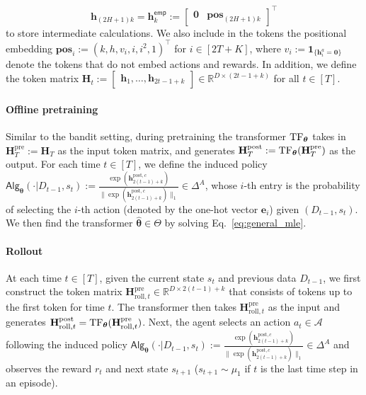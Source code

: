 \documentclass[10pt]{article}
\newcommand{\<}{\left\langle}
\renewcommand{\>}{\right\rangle}
\newcommand{\TF}{{\rm TF}}
\newcommand{\bzero}{{\mathbf 0}}
\newcommand{\bone}{{\mathbf 1}}
\newcommand{\R}{\mathbb{R}}
\newcommand{\pre}{{\mathrm{pre}}}
\newcommand{\posv}{{\mathbf{pos}}}
\newcommand{\post}{{\mathrm{post}}}
\newcommand{\parta}{{a}}
\newcommand{\partc}{{c}}
\newcommand{\state}{{s}}
\newcommand{\action}{{a}}
\newcommand{\reward}{{r}}
\newcommand{\totlen}{{T}} %
\newcommand{\sAlg}{{\mathsf{Alg}}}
\newcommand{\dset}{{D}}
\newcommand{\esttfpar}{{\widehat{\btheta}}}
\newcommand{\Numepi}{{K}}
\newcommand{\horizon}{{H}}
\newcommand{\actionsp}{{\mathcal{A}}}
\renewcommand{\horizon}{{H}}
\newcommand{\init}{{\mu_1}}
\newcommand{\tfpar}{{\btheta}}
\newcommand{\tfparspace}{{\Theta}}
\newcommand{\roll}{{\mathrm{roll}}}
\newcommand{\Numact}{{A}}
\newcommand{\oddeven}{{v}}
\newcommand{\emp}{{\mathsf{emp}}}
\def\bH{{\mathbf H}}
\def\btheta{{\boldsymbol \theta}}
\def\be{{\mathbf e}}
\def\bh{{\mathbf h}}
\begin{document}
$$
\bh_{(2\horizon+1)k}=\bh^{\emp}_{k}:=\begin{bmatrix}
    \bzero &\posv_{(2\horizon+1)k}
\end{bmatrix}^\top
$$ to store intermediate calculations. We also include in the tokens  the positional embedding $\posv_i:=(k,h,v_i,i,i^2,1)^\top$ for $i\in[2\totlen+\Numepi]$, where $\oddeven_i:=\bone_{\{\bh_i^\parta=\bzero\}}$  denote the tokens that do not embed actions and rewards.    In addition, we define  the token matrix $\bH_t:=\begin{bmatrix}
    \bh_1,\ldots,\bh_{2t-1+k}
\end{bmatrix}\in\R^{D\times (2t-1+k)}$ for all $t\in[\totlen]$.




\paragraph{Offline pretraining} 
Similar to the bandit setting, during
pretraining the transformer $\TF_\tfpar$ takes in   $\bH_\totlen^\pre:=\bH_\totlen$ as the input token matrix, and generates $\bH_\totlen^\post:=\TF_\tfpar(\bH_\totlen^\pre)$ as the output. For each time $t\in[\totlen]$, we define the  induced policy  $\sAlg_\tfpar(\cdot|\dset_{t-1},\state_t):=\frac{\exp(\bh^{\post,\partc}_{2(t-1)+k})}{\|\exp(\bh^{\post,\partc}_{2(t-1)+k})\|_1}\in\Delta^\Numact$, whose $i$-th entry is the probability of selecting the $i$-th action (denoted by the  one-hot vector $\be_i$) given $(\dset_{t-1},\state_t)$. We then find the transformer $\esttfpar\in\tfparspace$ by solving Eq.~\eqref{eq:general_mle}. 

\paragraph{Rollout}
At each time $t\in[\totlen]$, given the  current state $\state_t$ and  previous data $\dset_{t-1}$, we first construct the token matrix $\bH^{\pre}_{\roll,t}\in\R^{D\times 2(t-1)+k}$ that consists of tokens up to the first token for time $t$.   The transformer then takes $\bH^{\pre}_{\roll,t}$ as the input  and generates $\bH^{\post}_{\roll,t}=\TF_\tfpar(\bH^{\pre}_{\roll,t})$. Next,  the agent selects an action $\action_t\in\actionsp$ following  the induced  policy $\sAlg_\tfpar(\cdot|\dset_{t-1},\state_t):=\frac{\exp(\bh^{\post,\partc}_{2(t-1)+k})}{\|\exp(\bh^{\post,\partc}_{2(t-1)+k})\|_1}\in\Delta^\Numact$ and observes the reward $\reward_t$ and next state $\state_{t+1}$ ($\state_{t+1}\sim\init$ if $t$ is the last time step in an episode).
\end{document}
